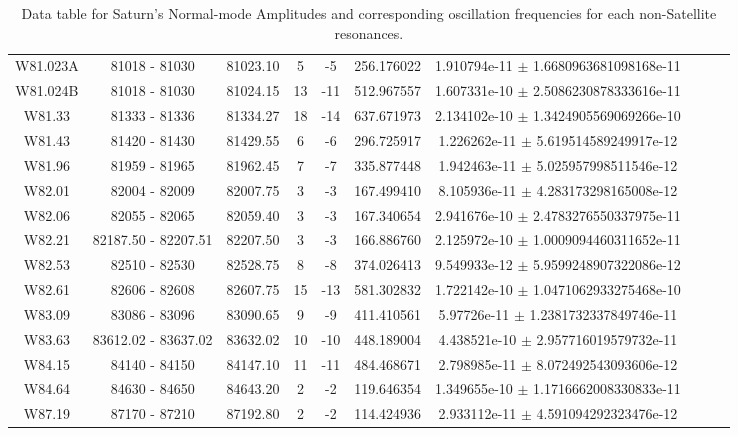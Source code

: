 \documentclass{article}
\begin{document}
\begin{table}[h]
{\begin{tabular}{|c|c|c|c|c|c|c|c|c|c|}
W81.023A & 81018 - 81030 & 81023.10 & 5 & -5 & 256.176022 & 1.910794e-11 $\pm$ 1.6680963681098168e-11 \\
W81.024B & 81018 - 81030 & 81024.15 & 13 & -11 & 512.967557 & 1.607331e-10 $\pm$ 2.5086230878333616e-11 \\
W81.33 & 81333 - 81336 & 81334.27 & 18 & -14 & 637.671973 & 2.134102e-10 $\pm$ 1.3424905569069266e-10 \\
W81.43 & 81420 - 81430 & 81429.55 & 6 & -6 & 296.725917 & 1.226262e-11 $\pm$ 5.619514589249917e-12 \\
W81.96 & 81959 - 81965 & 81962.45 & 7 & -7 & 335.877448 & 1.942463e-11 $\pm$ 5.025957998511546e-12 \\
W82.01 & 82004 - 82009 & 82007.75 & 3 & -3 & 167.499410 & 8.105936e-11 $\pm$ 4.283173298165008e-12 \\
W82.06 & 82055 - 82065 & 82059.40 & 3 & -3 & 167.340654 & 2.941676e-10 $\pm$ 2.4783276550337975e-11 \\
W82.21 & 82187.50 - 82207.51 & 82207.50 & 3 & -3 & 166.886760 & 2.125972e-10 $\pm$ 1.0009094460311652e-11 \\
W82.53 & 82510 - 82530 & 82528.75 & 8 & -8 & 374.026413 & 9.549933e-12 $\pm$ 5.9599248907322086e-12 \\
W82.61 & 82606 - 82608 & 82607.75 & 15 & -13 & 581.302832 & 1.722142e-10 $\pm$ 1.0471062933275468e-10 \\
W83.09 & 83086 - 83096 & 83090.65 & 9 & -9 & 411.410561 & 5.97726e-11 $\pm$ 1.2381732337849746e-11 \\
W83.63 & 83612.02 - 83637.02 & 83632.02 & 10 & -10 & 448.189004 & 4.438521e-10 $\pm$ 2.957716019579732e-11 \\
W84.15 & 84140 - 84150 & 84147.10 & 11 & -11 & 484.468671 & 2.798985e-11 $\pm$ 8.072492543093606e-12 \\
W84.64 & 84630 - 84650 & 84643.20 & 2 & -2 & 119.646354 & 1.349655e-10 $\pm$ 1.1716662008330833e-11 \\
W87.19 & 87170 - 87210 & 87192.80 & 2 & -2 & 114.424936 & 2.933112e-11 $\pm$ 4.591094292323476e-12 \\
\hline
\end{tabular}
\vspace{-1.5cm}
}
\caption{Data table for Saturn's Normal-mode Amplitudes and corresponding oscillation frequencies for each non-Satellite resonances.}
\end{table}


\end{document}

